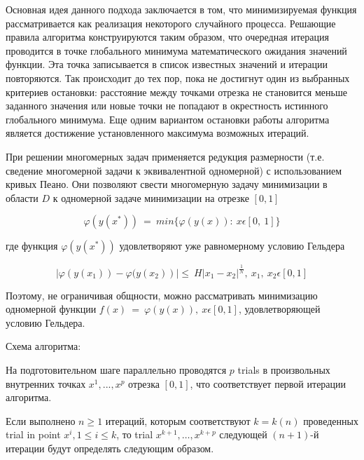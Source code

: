 \documentclass{svproc}
\begin{document}
Основная идея данного подхода заключается в том, что минимизируемая функция рассматривается как реализация некоторого случайного процесса. Решающие правила алгоритма конструируются таким образом, что очередная итерация проводится в точке глобального минимума математического ожидания значений функции. Эта точка записывается в список известных значений и итерации повторяются. Так происходит до тех пор, пока не достигнут один из выбранных критериев остановки: расстояние между точками отрезка не становится меньше заданного значения или новые точки не попадают в окрестность истинного глобального минимума. Еще одним вариантом остановки работы алгоритма является достижение установленного максимума возможных итераций. \cite{fio_bib10}

При решении многомерных задач применяется редукция размерности (т.е. сведение многомерной задачи к эквивалентной одномерной) с использованием кривых Пеано. Они позволяют свести многомерную задачу минимизации в области $D$  к одномерной задаче минимизации на отрезке $[0, 1]$

\begin{displaymath}
\varphi(y(x^\ast))\ =\ min\{\varphi(y(x)):\ x\epsilon[0,\ 1]\}
\end{displaymath}

где функция $\varphi(y(x^\ast))$  удовлетворяют уже равномерному условию Гельдера

\begin{displaymath}
\left|\varphi (y \left(x_1\right))- \varphi (y \left(x_2\right)\right )|\le\ H\left|x_1-x_2\right|^\frac{1}{N},\ x_1,\ x_2\epsilon[0,1]		
\end{displaymath}

Поэтому, не ограничивая общности, можно рассматривать минимизацию одномерной функции $f(x)\ =\ \varphi(y(x)), \ x\epsilon [0,1]$, удовлетворяющей условию Гельдера.

Схема алгоритма:

На подготовительном шаге параллельно проводятся $p$ trials в произвольных внутренних точках $x^1, ...,x^p$ отрезка $[0,1]$, что соответствует первой итерации  алгоритма. 

Если выполнено $n\geq1$ итераций, которым соответствуют $k=k(n)$ проведенных trial in point $x^i, 1\leq i\leq k$, то trial $x^{k+1},\ldots,x^{k+p}$  следующей $(n+1)$-й итерации будут определять следующим образом.
\end{document}
